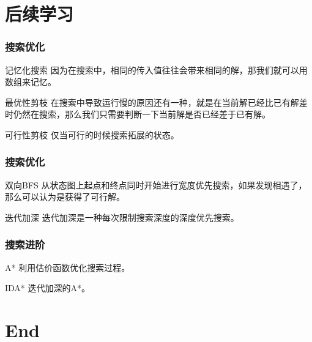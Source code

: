 \documentclass[11pt]{beamer}
\begin{document}
  \section{后续学习}
  \begin{frame}[c]
  	\frametitle{搜索优化}
  	\begin{block}{记忆化搜索}
  	  因为在搜索中，相同的传入值往往会带来相同的解，那我们就可以用数组来记忆。
  	\end{block}
  	\begin{block}{最优性剪枝}
  	  在搜索中导致运行慢的原因还有一种，就是在当前解已经比已有解差时仍然在搜索，那么我们只需要判断一下当前解是否已经差于已有解。
  	\end{block}
  	\begin{block}{可行性剪枝}
  	  仅当可行的时候搜索拓展的状态。
  	\end{block}
  \end{frame}
  \begin{frame}[c]
  	\frametitle{搜索优化}
  	\begin{block}{双向BFS}
  	  从状态图上起点和终点同时开始进行宽度优先搜索，如果发现相遇了，那么可以认为是获得了可行解。
  	\end{block}
  	\begin{block}{迭代加深}
  	  迭代加深是一种每次限制搜索深度的深度优先搜索。
  	\end{block}
  \end{frame}
  \begin{frame}[c]
  	\frametitle{搜索进阶}
  	\begin{block}{A*}
  	  利用估价函数优化搜索过程。
  	\end{block}
  	\begin{block}{IDA*}
  	  迭代加深的A*。
  	\end{block}
  \end{frame}

  \section{End}
  \begin{frame}
  \titlepage
  \end{frame}
\end{document}
